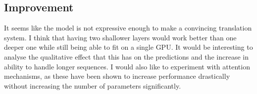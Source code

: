 \documentclass[]{article}
\begin{document}
\subsection{Improvement}
It seems like the model is not expressive enough to make a convincing translation system. I think that having two shallower layers would work better than one deeper one while still being able to fit on a single GPU. It would be interesting to analyse the qualitative effect that this has on the predictions and the increase in ability to handle longer sequences. I would also like to experiment with attention mechanisms, as these have been shown to increase performance drastically without increasing the number of parameters significantly.
\end{document}
